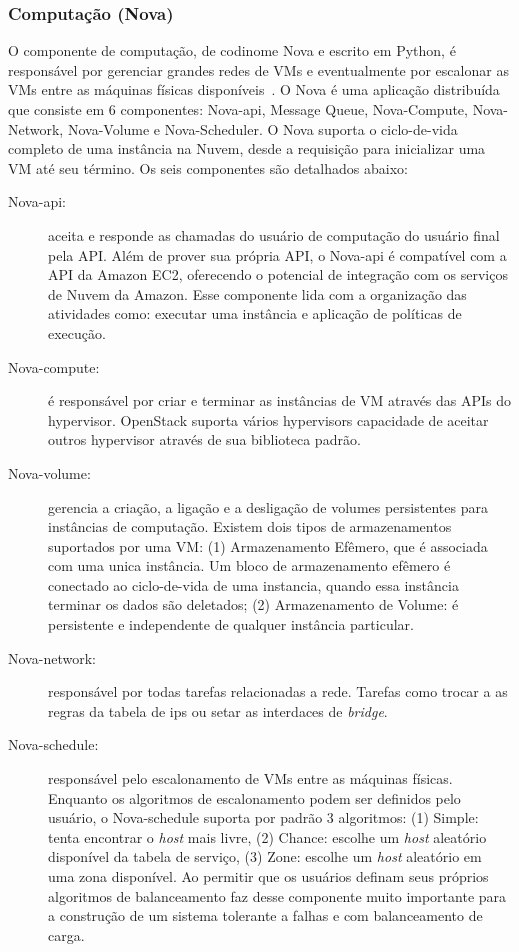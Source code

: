 \subsubsection{Computação (Nova)}

O componente de computação, de codinome Nova e escrito em Python, é responsável por gerenciar grandes redes de VMs e eventualmente por escalonar as VMs entre as máquinas físicas disponíveis~\cite{OpenStack:Online}. O Nova é uma aplicação distribuída que consiste em 6 componentes: Nova-api, Message Queue, Nova-Compute, Nova-Network, Nova-Volume e Nova-Scheduler. O Nova suporta o ciclo-de-vida completo de uma instância na Nuvem, desde a requisição para inicializar uma VM até seu término. Os seis componentes são detalhados abaixo:

\begin{description}

	\item[Nova-api:] aceita e responde as chamadas do usuário de computação do usuário final pela API. Além de prover sua própria API, o Nova-api é compatível com a API da Amazon EC2, oferecendo o potencial de integração com os serviços de Nuvem da Amazon. Esse componente lida com a organização das atividades como: executar uma instância e aplicação de políticas de execução.

	\item[Nova-compute:] é responsável por criar e terminar as instâncias de VM através das APIs do hypervisor. OpenStack suporta vários hypervisors capacidade de aceitar outros hypervisor através de sua biblioteca padrão.

	\item[Nova-volume:] gerencia a criação, a ligação e a desligação de volumes persistentes para instâncias de computação. Existem dois tipos de armazenamentos suportados por uma VM: (1) Armazenamento Efêmero, que é associada com uma unica instância. Um bloco de armazenamento efêmero é conectado ao ciclo-de-vida de uma instancia, quando essa instância terminar os dados são deletados; (2) Armazenamento de Volume: é persistente e independente de qualquer instância particular. 

	\item[Nova-network:] responsável por todas tarefas relacionadas a rede. Tarefas como trocar a as regras da tabela de ips ou setar as interdaces de \textit{bridge}.

	\item[Nova-schedule:] responsável pelo escalonamento de VMs entre as máquinas físicas. Enquanto os algoritmos de escalonamento podem ser definidos pelo usuário, o Nova-schedule suporta por padrão 3 algoritmos: (1) Simple: tenta encontrar o \textit{host} mais livre, (2) Chance: escolhe um \textit{host} aleatório disponível da tabela de serviço, (3) Zone: escolhe um \textit{host} aleatório em uma zona disponível. Ao permitir que os usuários definam seus próprios algoritmos de balanceamento faz desse componente muito importante para a construção de um sistema tolerante a falhas e com balanceamento de carga.


\end{description}
